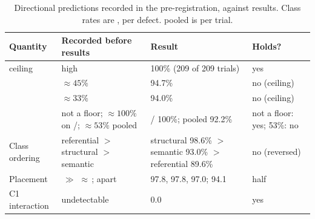 \begin{table}[t]
\centering
\caption{Directional predictions recorded in the pre-registration, against
results. Class rates are , per defect.  pooled is per trial.}
\label{tab:predictions}
\footnotesize
\begin{tabularx}{\linewidth}{@{}L{2.2cm} Y Y L{2.0cm}@{}}
\toprule
Quantity & Recorded before results & Result & Holds? \\
\midrule
{} ceiling & high & 100\% (209 of 209 trials) & yes \\
 & $\approx 45\%$ & 94.7\% & no (ceiling) \\
 & $\approx 33\%$ & 94.0\% & no (ceiling) \\
 & not a floor; $\approx100\%$ on /; $\approx53\%$ pooled
  & / 100\%; pooled 92.2\% & not a floor: yes; 53\%: no \\
Class ordering & referential $>$ structural $>$ semantic & structural 98.6\%
  $>$ semantic 93.0\% $>$ referential 89.6\% & no (reversed) \\
Placement & \,$\gg$\,\,$\approx$\,;  apart &
   97.8,  97.8,  97.0;  94.1 & half \\
C1 interaction & undetectable & 0.0\pp{}  & yes \\
\bottomrule
\end{tabularx}
\end{table}


